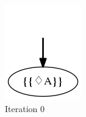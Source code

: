 \begin{example}
	\begin{figure}[h]
		\centering
		\begin{subfigure}[b]{0.17\textwidth}
			\includegraphics[width=\textwidth]{images/on-the-fly-eventually-A-it-0}
			\caption{Iteration 0}
			\label{fig:exa-on-the-fly-eventually-A-it-0}
		\end{subfigure}
		~ %
		\begin{subfigure}[b]{0.50\textwidth}

\end{subfigure}
\end{figure}
\end{example}
